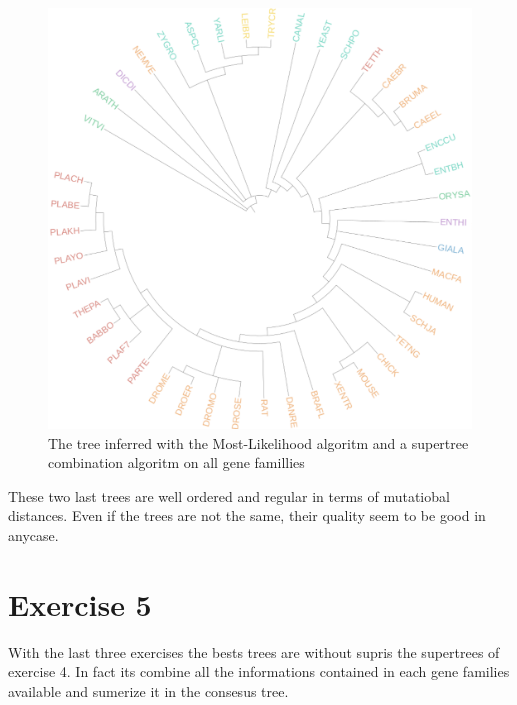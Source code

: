 \documentclass[]{article}
\theoremstyle{definition}
\begin{document}
\begin{figure}[H]
	\includegraphics*[width = \linewidth]{image/ML_supertree.pdf}
	\caption{ The tree inferred with the Most-Likelihood algoritm and a supertree combination algoritm on all gene famillies}
\end{figure}

These two last trees are well ordered and regular in terms of mutatiobal distances. Even if the trees are not the same, their quality seem to be good in anycase.

\section{Exercise 5}

With the last three exercises the bests trees are without supris the supertrees of exercise 4. In fact its combine all the informations contained in each gene families available and sumerize it in the consesus tree.
\end{document}
